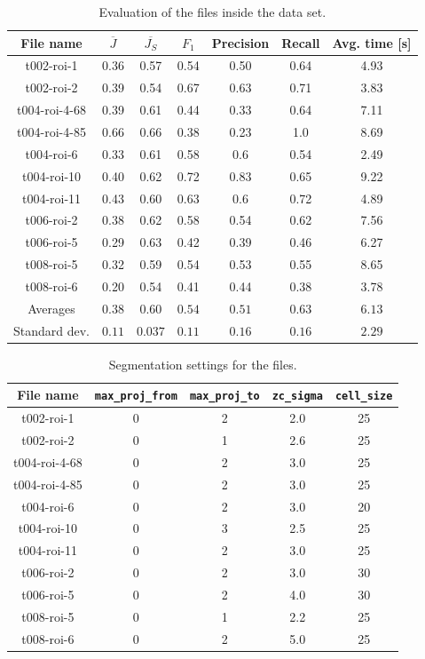 \documentclass[
  digital,     %
  oneside,     %
  nosansbold,  %
  nocolorbold, %
  lof,         %
  lot,         %
]{fithesis4}
\begin{document}
\begin{table}
    \hspace*{-0.5cm}\begin{tabular}{|| c|c|c|c|c|c|c ||}
        \toprule
        File name & $\overline{J}$ & $\overline{J_S}$ & \ensuremath{F_1} & Precision & Recall & Avg. time [s]\\
        \midrule
        t002-roi-1&0.36&0.57&0.54&0.50&0.64&4.93\\
        t002-roi-2&0.39&0.54&0.67&0.63&0.71&3.83\\
        t004-roi-4-68&0.39&0.61&0.44&0.33&0.64&7.11\\
        t004-roi-4-85&0.66&0.66&0.38&0.23&1.0&8.69\\
        t004-roi-6&0.33&0.61&0.58&0.6&0.54&2.49\\
        t004-roi-10&0.40&0.62&0.72&0.83&0.65&9.22\\
        t004-roi-11&0.43&0.60&0.63&0.6&0.72&4.89\\
        t006-roi-2&0.38&0.62&0.58&0.54&0.62&7.56\\
        t006-roi-5&0.29&0.63&0.42&0.39&0.46&6.27\\
        t008-roi-5&0.32&0.59&0.54&0.53&0.55&8.65\\
        t008-roi-6&0.20&0.54&0.41&0.44&0.38&3.78\\
        \midrule
        Averages&$0.38$&$0.60$&$0.54$&$0.51$&$0.63$&$6.13$\\
        Standard dev.&$0.11$&$0.037$&$0.11$&$0.16$&$0.16$&$2.29$\\
        \bottomrule
    \end{tabular}
    \caption{Evaluation of the files inside the data set.}
    \label{tab:scores}
\end{table}

\begin{table}
    \hspace*{-0.5cm}\begin{tabular}{|| c|c|c|c|c ||}
        \toprule
        File name & \texttt{max\_proj\_from} & \texttt{max\_proj\_to}& \texttt{zc\_sigma} & \texttt{cell\_size}\\
        \midrule
        t002-roi-1   &0&2&2.0&25\\
        t002-roi-2   &0&1&2.6&25\\
        t004-roi-4-68&0&2&3.0&25\\
        t004-roi-4-85&0&2&3.0&25\\
        t004-roi-6   &0&2&3.0&20\\
        t004-roi-10  &0&3&2.5&25\\
        t004-roi-11  &0&2&3.0&25\\
        t006-roi-2   &0&2&3.0&30\\
        t006-roi-5   &0&2&4.0&30\\
        t008-roi-5   &0&1&2.2&25\\
        t008-roi-6   &0&2&5.0&25\\
        \bottomrule
    \end{tabular}
    \caption{Segmentation settings for the files.}
    \label{table:configurations}
\end{table}
\end{document}
